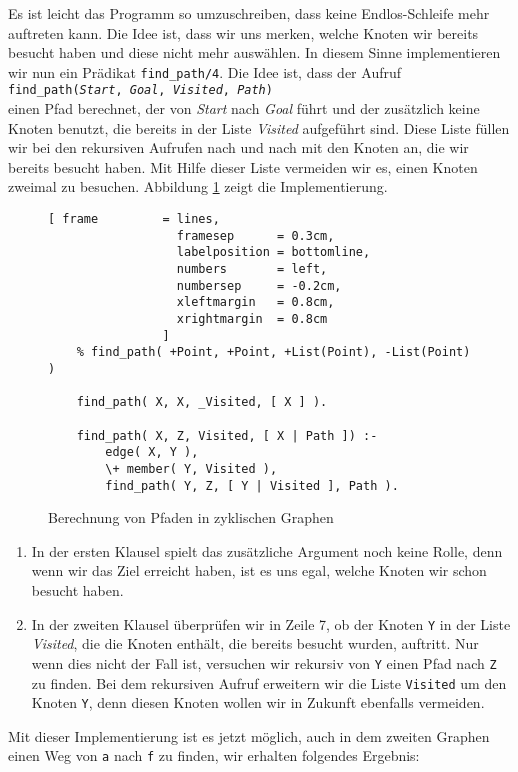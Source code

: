 Es ist leicht das Programm so umzuschreiben, dass keine Endlos-Schleife mehr
auftreten kann.  Die Idee ist, dass wir uns merken, welche Knoten wir bereits besucht
haben und diese nicht mehr ausw\"{a}hlen.  In diesem Sinne implementieren wir nun ein Pr\"{a}dikat \texttt{find\_path/4}.
Die Idee ist, dass der Aufruf \\[0.1cm]
\hspace*{1.3cm} \texttt{find\_path(\textsl{Start}, \textsl{Goal}, \textsl{Visited}, \textsl{Path})} \\[0.1cm]
einen Pfad berechnet, der von \textsl{Start} nach \textsl{Goal} f\"{u}hrt und der zus\"{a}tzlich
keine Knoten benutzt, die bereits in der Liste \textsl{Visited} aufgef\"{u}hrt sind.  Diese Liste
f\"{u}llen wir bei den rekursiven Aufrufen nach und nach mit den Knoten an, die wir bereits
besucht haben.  Mit Hilfe dieser Liste vermeiden wir es, einen Knoten zweimal zu besuchen.
Abbildung \ref{fig:connect2} zeigt die Implementierung.
\begin{figure}[!h]
  \centering
\begin{Verbatim}[ frame         = lines, 
                  framesep      = 0.3cm, 
                  labelposition = bottomline,
                  numbers       = left,
                  numbersep     = -0.2cm,
                  xleftmargin   = 0.8cm,
                  xrightmargin  = 0.8cm
                ]
    % find_path( +Point, +Point, +List(Point), -List(Point) )

    find_path( X, X, _Visited, [ X ] ).
    
    find_path( X, Z, Visited, [ X | Path ]) :-
        edge( X, Y ),
        \+ member( Y, Visited ),
        find_path( Y, Z, [ Y | Visited ], Path ).
    \end{Verbatim}
\vspace*{-0.3cm}
  \caption{Berechnung von Pfaden in zyklischen Graphen}
  \label{fig:connect2}
\end{figure}
\begin{enumerate}
\item In der ersten Klausel spielt das zus\"{a}tzliche Argument noch keine Rolle,
      denn wenn wir das Ziel erreicht haben, ist es uns egal, welche Knoten wir schon
      besucht haben.
\item In der zweiten Klausel \"{u}berpr\"{u}fen wir in Zeile 7, ob der Knoten \texttt{Y}
      in der Liste \textsl{Visited}, die die Knoten enth\"{a}lt, die bereits besucht wurden,
      auftritt.  Nur wenn dies nicht der Fall ist, versuchen wir rekursiv von \texttt{Y}
      einen Pfad nach \texttt{Z} zu finden.  Bei dem rekursiven Aufruf erweitern wir die Liste
      \texttt{Visited} um den Knoten \texttt{Y}, denn diesen Knoten wollen wir in Zukunft
      ebenfalls vermeiden.
\end{enumerate}
Mit dieser Implementierung ist es jetzt m\"{o}glich, auch in dem zweiten Graphen einen Weg von
\texttt{a} nach \texttt{f} zu finden, wir erhalten folgendes Ergebnis:
\pagebreak

